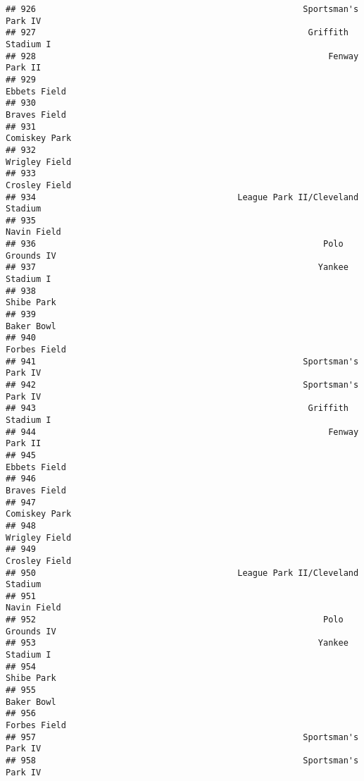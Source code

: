 \documentclass[]{article}
\begin{document}
\begin{verbatim}
## 926                                                     Sportsman's Park IV
## 927                                                      Griffith Stadium I
## 928                                                          Fenway Park II
## 929                                                            Ebbets Field
## 930                                                            Braves Field
## 931                                                           Comiskey Park
## 932                                                           Wrigley Field
## 933                                                           Crosley Field
## 934                                        League Park II/Cleveland Stadium
## 935                                                             Navin Field
## 936                                                         Polo Grounds IV
## 937                                                        Yankee Stadium I
## 938                                                              Shibe Park
## 939                                                              Baker Bowl
## 940                                                            Forbes Field
## 941                                                     Sportsman's Park IV
## 942                                                     Sportsman's Park IV
## 943                                                      Griffith Stadium I
## 944                                                          Fenway Park II
## 945                                                            Ebbets Field
## 946                                                            Braves Field
## 947                                                           Comiskey Park
## 948                                                           Wrigley Field
## 949                                                           Crosley Field
## 950                                        League Park II/Cleveland Stadium
## 951                                                             Navin Field
## 952                                                         Polo Grounds IV
## 953                                                        Yankee Stadium I
## 954                                                              Shibe Park
## 955                                                              Baker Bowl
## 956                                                            Forbes Field
## 957                                                     Sportsman's Park IV
## 958                                                     Sportsman's Park IV

\end{verbatim}
\end{document}
